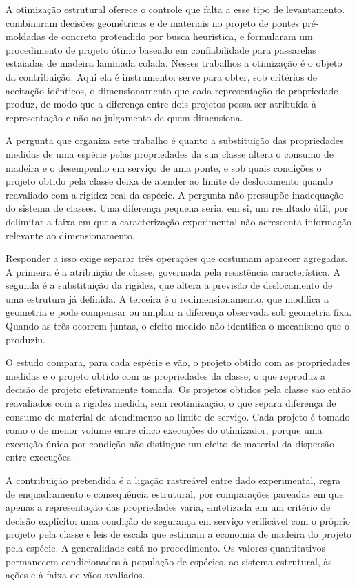 A otimização estrutural oferece o controle que falta a esse tipo de levantamento. \textcite{Marti2013} combinaram decisões geométricas e de materiais no projeto de pontes pré-moldadas de concreto protendido por busca heurística, e \textcite{SimoesNegrao2005} formularam um procedimento de projeto ótimo baseado em confiabilidade para passarelas estaiadas de madeira laminada colada. Nesses trabalhos a otimização é o objeto da contribuição. Aqui ela é instrumento: serve para obter, sob critérios de aceitação idênticos, o dimensionamento que cada representação de propriedade produz, de modo que a diferença entre dois projetos possa ser atribuída à representação e não ao julgamento de quem dimensiona.

A pergunta que organiza este trabalho é quanto a substituição das propriedades medidas de uma espécie pelas propriedades da sua classe altera o consumo de madeira e o desempenho em serviço de uma ponte, e sob quais condições o projeto obtido pela classe deixa de atender ao limite de deslocamento quando reavaliado com a rigidez real da espécie. A pergunta não pressupõe inadequação do sistema de classes. Uma diferença pequena seria, em si, um resultado útil, por delimitar a faixa em que a caracterização experimental não acrescenta informação relevante ao dimensionamento.

Responder a isso exige separar três operações que costumam aparecer agregadas. A primeira é a atribuição de classe, governada pela resistência característica. A segunda é a substituição da rigidez, que altera a previsão de deslocamento de uma estrutura já definida. A terceira é o redimensionamento, que modifica a geometria e pode compensar ou ampliar a diferença observada sob geometria fixa. Quando as três ocorrem juntas, o efeito medido não identifica o mecanismo que o produziu.

O estudo compara, para cada espécie e vão, o projeto obtido com as propriedades medidas e o projeto obtido com as propriedades da classe, o que reproduz a decisão de projeto efetivamente tomada. Os projetos obtidos pela classe são então reavaliados com a rigidez medida, sem reotimização, o que separa diferença de consumo de material de atendimento ao limite de serviço. Cada projeto é tomado como o de menor volume entre cinco execuções do otimizador, porque uma execução única por condição não distingue um efeito de material da dispersão entre execuções.

A contribuição pretendida é a ligação rastreável entre dado experimental, regra de enquadramento e consequência estrutural, por comparações pareadas em que apenas a representação das propriedades varia, sintetizada em um critério de decisão explícito: uma condição de segurança em serviço verificável com o próprio projeto pela classe e leis de escala que estimam a economia de madeira do projeto pela espécie. A generalidade está no procedimento. Os valores quantitativos permanecem condicionados à população de espécies, ao sistema estrutural, às ações e à faixa de vãos avaliados.
